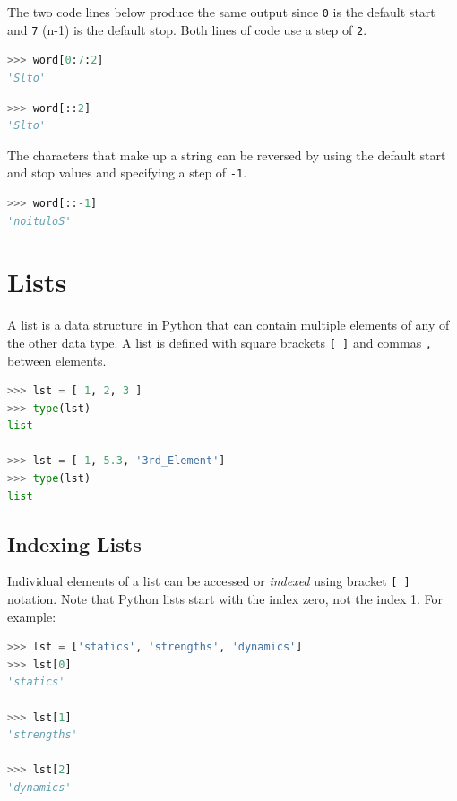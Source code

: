 \documentclass{book}
\begin{document}
The two code lines below produce the same output since \lstinline!0! is
the default start and \lstinline!7! (n-1) is the default stop. Both
lines of code use a step of \lstinline!2!.

\begin{lstlisting}[language=Python]
>>> word[0:7:2]
'Slto'
\end{lstlisting}

\begin{lstlisting}[language=Python]
>>> word[::2]
'Slto'
\end{lstlisting}

The characters that make up a string can be reversed by using the
default start and stop values and specifying a step of \lstinline!-1!.

\begin{lstlisting}[language=Python]
>>> word[::-1]
'noituloS'
\end{lstlisting}
    




    
        \section{Lists}\label{lists}
    




    
        A list is a data structure in Python that can contain multiple elements
of any of the other data type. A list is defined with square brackets
\lstinline![ ]! and commas \lstinline!,! between elements.

\begin{lstlisting}[language=Python]
>>> lst = [ 1, 2, 3 ]
>>> type(lst)
list

>>> lst = [ 1, 5.3, '3rd_Element']
>>> type(lst)
list
\end{lstlisting}
    




    
        \subsection{Indexing Lists}\label{indexing-lists}

Individual elements of a list can be accessed or \emph{indexed} using
bracket \lstinline![ ]! notation. Note that Python lists start with the
index zero, not the index 1. For example:

\begin{lstlisting}[language=Python]
>>> lst = ['statics', 'strengths', 'dynamics']
>>> lst[0]
'statics'

>>> lst[1]
'strengths'

>>> lst[2]
'dynamics'
\end{lstlisting}
\end{document}
